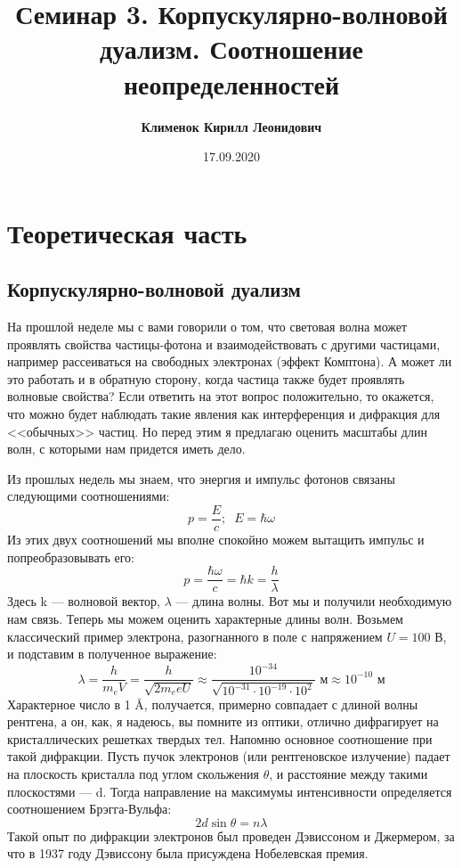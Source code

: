 \documentclass[12pt]{article}
\begin{document}
 

\title{\textbf{Семинар 3. Корпускулярно-волновой дуализм. Соотношение неопределенностей}}
\author{\textbf{Клименок Кирилл Леонидович}}
\date{17.09.2020}
\maketitle

\section{Теоретическая часть}

\subsection{Корпускулярно-волновой дуализм}
На прошлой неделе мы с вами говорили о том, что световая волна может проявлять свойства частицы-фотона и взаимодействовать с другими частицами, например рассеиваться на свободных электронах (эффект Комптона). А может ли это работать и в обратную сторону, когда частица также будет проявлять волновые свойства? Если ответить на этот вопрос положительно, то окажется, что можно будет наблюдать такие явления как интерференция и дифракция для <<обычных>> частиц. Но перед этим я предлагаю оценить масштабы длин волн, с которыми нам придется иметь дело. 

Из прошлых недель мы знаем, что энергия и импульс фотонов связаны следующими соотношениями:
\begin{equation*}
    p = \dfrac{E}{c}; \;\; E = \hbar \omega
\end{equation*}
Из этих двух соотношений мы вполне спокойно можем вытащить импульс и попреобразовывать его:
\begin{equation}
    p = \dfrac{\hbar \omega}{c} = \hbar k = \dfrac{h}{\lambda}
\end{equation}
Здесь k --- волновой вектор, $\lambda$ --- длина волны. Вот мы и получили необходимую нам связь. Теперь мы можем оценить характерные длины волн. Возьмем классический пример электрона, разогнанного в поле с напряжением $U=100$ В, и подставим в полученное выражение:
\begin{equation*}
    \lambda = \dfrac{h}{m_eV} = \dfrac{h}{\sqrt{2m_eeU}} \approx \dfrac{10^{-34}}{\sqrt{10^{-31}\cdot10^{-19}\cdot10^{2}}} \text{ м} \approx 10^{-10} \text{ м}
\end{equation*}
Характерное число в 1 \AA, получается, примерно совпадает с длиной волны рентгена, а он, как, я надеюсь, вы помните из оптики, отлично дифрагирует на кристаллических решетках твердых тел. Напомню основное соотношение при такой дифракции. Пусть пучок электронов (или рентгеновское излучение) падает на плоскость кристалла под углом скольжения $\theta$, и расстояние между такими плоскостями --- d. Тогда направление на максимумы интенсивности определяется соотношением Брэгга-Вульфа: 
\begin{equation*}
    2d\sin{\theta} = n\lambda
\end{equation*}
Такой опыт по дифракции электронов был проведен Дэвиссоном и Джермером, за что в 1937 году Дэвиссону была присуждена Нобелевская премия.
\end{document}
